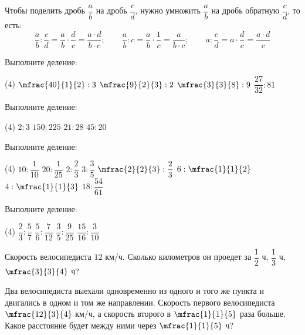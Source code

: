 %
%
\begin{class}[number=2]
	\begin{definit}
		Чтобы поделить дробь \( \dfrac{a}{b} \) на дробь \( \dfrac{c}{d} \), нужно умножить \( \dfrac{a}{b} \) на дробь обратную \( \dfrac{c}{d} \), то есть:
		\[ \dfrac{a}{b}:\dfrac{c}{d}=\dfrac{a}{b}\cdot\dfrac{d}{c}=\dfrac{a\cdot d}{b\cdot c};\qquad\dfrac{a}{b}:c=\dfrac{a}{b}\cdot\dfrac{1}{c}=\dfrac{a}{b\cdot c};\qquad a:\dfrac{c}{d}=a\cdot\dfrac{d}{c}=\dfrac{a\cdot d}{c} \]
	\end{definit}
	\begin{listofex}
		\item Выполните деление:
		\begin{tasks}(4)
			\task \( \mfrac{40}{1}{2}:3 \)
			\task \( \mfrac{9}{2}{3}:2 \)
			\task \( \mfrac{3}{3}{8}:9 \)
			\task \( \dfrac{27}{32}:81 \)
		\end{tasks}
		\item Выполните деление:
		\begin{tasks}(4)
			\task \( 2:3 \)
			\task \( 150:225 \)
			\task \( 21:28 \)
			\task \( 45:20 \)
		\end{tasks}
		\item Выполните деление:
		\begin{tasks}(4)
			\task \( 10:\dfrac{1}{10} \)
			\task \( 20:\dfrac{1}{25} \)
			\task \( 2:\dfrac{2}{3} \)
			\task \( 3:\dfrac{3}{5} \)
			\task \( \mfrac{2}{2}{3}:\dfrac{2}{3} \)
			\task \( 6:\mfrac{1}{1}{2} \)
			\task \( 4:\mfrac{1}{1}{3} \)
			\task \( 18:\dfrac{54}{61} \)
		\end{tasks}
		\item Выполните деление:
		\begin{tasks}(4)
			\task \( \dfrac{2}{3}:\dfrac{5}{7} \)
			\task \( \dfrac{5}{6}:\dfrac{7}{12} \)
			\task \( \dfrac{3}{5}:\dfrac{9}{25} \)
			\task \( \dfrac{15}{16}:\dfrac{3}{10} \)
		\end{tasks}
		\item Скорость велосипедиста \( 12  \) км/ч. Сколько километров он проедет за \( \dfrac{1}{2} \) ч, \( \dfrac{1}{3} \) ч, \( \mfrac{3}{3}{4} \) ч?
		\item Два велосипедиста выехали одновременно из одного и того же пункта и двигались в одном и том же направлении. Скорость первого велосипедиста \( \mfrac{12}{3}{4} \) км/ч, а скорость второго в \( \mfrac{1}{1}{5} \) раза больше. Какое расстояние будет между ними через \( \mfrac{1}{1}{5} \) ч?
	\end{listofex}
\end{class}
